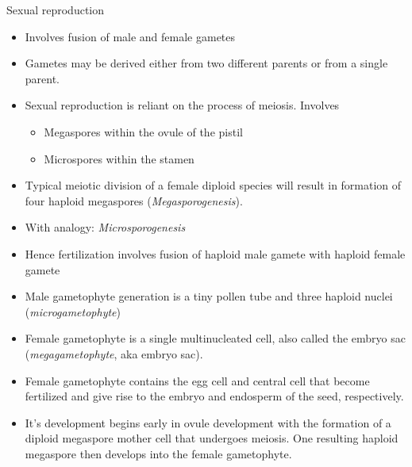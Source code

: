 \documentclass[11pt,ignorenonframetext,aspectratio=169]{beamer}
\providecommand{\tightlist}{%
  \setlength{\itemsep}{0pt}\setlength{\parskip}{0pt}}
\begin{document}
\begin{frame}{Sexual reproduction}
\protect\hypertarget{sexual-reproduction}{}
\begin{itemize}
\tightlist
\item
  Involves fusion of male and female gametes
\item
  Gametes may be derived either from two different parents or from a
  single parent.
\item
  Sexual reproduction is reliant on the process of meiosis. Involves

  \begin{itemize}
  \tightlist
  \item
    Megaspores within the ovule of the pistil
  \item
    Microspores within the stamen
  \end{itemize}
\item
  Typical meiotic division of a female diploid species will result in
  formation of four haploid megaspores (\emph{Megasporogenesis}).
\item
  With analogy: \emph{Microsporogenesis}
\item
  Hence fertilization involves fusion of haploid male gamete with
  haploid female gamete
\item
  Male gametophyte generation is a tiny pollen tube and three haploid
  nuclei (\emph{microgametophyte})
\item
  Female gametophyte is a single multinucleated cell, also called the
  embryo sac (\emph{megagametophyte}, aka embryo sac).
\end{itemize}
\end{frame}

\begin{frame}{}
\protect\hypertarget{section-1}{}
\begin{itemize}
\tightlist
\item
  Female gametophyte contains the egg cell and central cell that become
  fertilized and give rise to the embryo and endosperm of the seed,
  respectively.
\item
  It's development begins early in ovule development with the formation
  of a diploid megaspore mother cell that undergoes meiosis. One
  resulting haploid megaspore then develops into the female gametophyte.
\end{itemize}
\end{frame}
\end{document}
